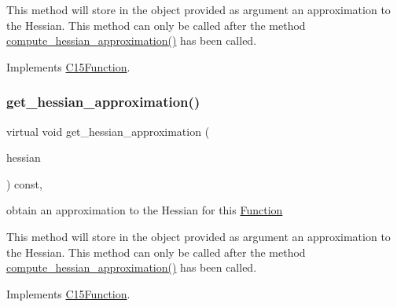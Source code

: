 This method will store in the object provided as argument an approximation to the Hessian. This method can only be called after the method \mbox{\hyperlink{class_s_m_spp__di__unipi__it_1_1_d_quad_function_a8f0ae6fd266900dca237c8c29b69cd5f}{compute\+\_\+hessian\+\_\+approximation()}} has been called. 

Implements \mbox{\hyperlink{class_s_m_spp__di__unipi__it_1_1_c15_function_a83dab9644742319aa313786952a15a78}{C15\+Function}}.

\mbox{\label{class_s_m_spp__di__unipi__it_1_1_d_quad_function_aca502bb3d537cfa9aaee68cbbc03a410}} 
\subsubsection{\texorpdfstring{get\+\_\+hessian\+\_\+approximation()}{get\_hessian\_approximation()}\hspace{0.1cm}{\footnotesize\ttfamily [2/2]}}
{\footnotesize\ttfamily virtual void get\+\_\+hessian\+\_\+approximation (\begin{DoxyParamCaption}\item[{\mbox{\hyperlink{class_s_m_spp__di__unipi__it_1_1_c15_function_af95b7c5c0969f493222b30b17aa58515}{Sparse\+Hessian}} \&}]{hessian }\end{DoxyParamCaption}) const\hspace{0.3cm}{\ttfamily [override]}, {\ttfamily [virtual]}}



obtain an approximation to the Hessian for this \mbox{\hyperlink{class_s_m_spp__di__unipi__it_1_1_function}{Function}} 

This method will store in the object provided as argument an approximation to the Hessian. This method can only be called after the method \mbox{\hyperlink{class_s_m_spp__di__unipi__it_1_1_d_quad_function_a8f0ae6fd266900dca237c8c29b69cd5f}{compute\+\_\+hessian\+\_\+approximation()}} has been called. 

Implements \mbox{\hyperlink{class_s_m_spp__di__unipi__it_1_1_c15_function_a5e5b31d85711c9e27252b7af6ff7e214}{C15\+Function}}.

